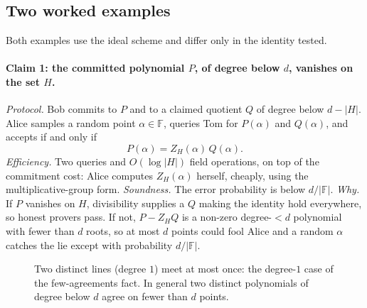 \documentclass[11pt]{article}
\begin{document}
\subsection{Two worked examples}

Both examples use the ideal scheme and differ only in the identity tested.

\paragraph{Claim 1: the committed polynomial $P$, of degree below $d$, vanishes on the set $H$.}
\emph{Protocol.} Bob commits to $P$ and to a claimed quotient $Q$ of degree below $d-|H|$. Alice
samples a random point $\alpha \in \mathbb{F}$, queries Tom for $P(\alpha)$ and $Q(\alpha)$, and
accepts if and only if
\begin{equation}
  P(\alpha) = Z_H(\alpha)\,Q(\alpha).
\end{equation}
\emph{Efficiency.} Two queries and $O(\log|H|)$ field operations, on top of the commitment cost:
Alice computes $Z_H(\alpha)$ herself, cheaply, using the multiplicative-group form. \emph{Soundness.}
The error probability is below $d/|\mathbb{F}|$. \emph{Why.} If $P$ vanishes on $H$, divisibility
supplies a $Q$ making the identity hold everywhere, so honest provers pass. If not, $P-Z_HQ$ is a
non-zero degree-$<d$ polynomial with fewer than $d$ roots, so at most $d$ points could fool Alice and a
random $\alpha$ catches the lie except with probability $d/|\mathbb{F}|$.

\begin{figure}[htbp]\centering
{}
\caption{Two distinct lines (degree $1$) meet at most once: the degree-$1$ case of the few-agreements
fact. In general two distinct polynomials of degree below $d$ agree on fewer than $d$ points.}
\label{fig:lines}
\end{figure}
\end{document}

